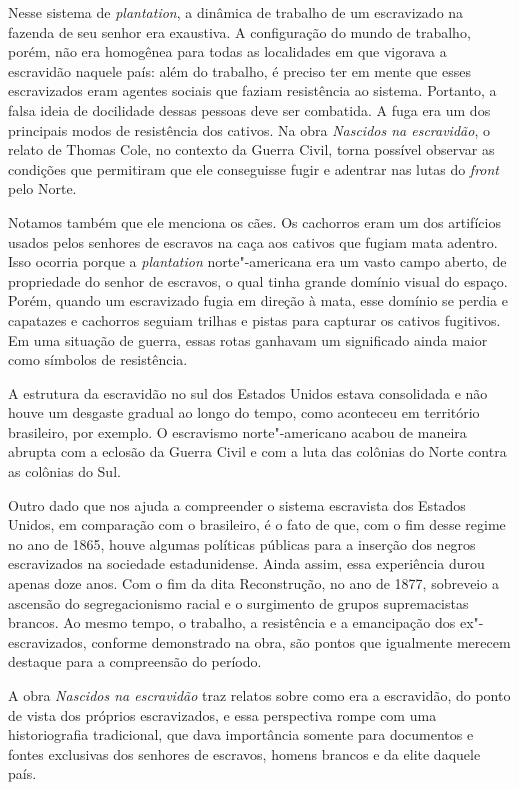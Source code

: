 \documentclass[11pt]{extarticle}
\begin{document}
Nesse sistema de \emph{plantation}, a dinâmica de trabalho de um
escravizado na fazenda de seu senhor era exaustiva. A configuração do
mundo de trabalho, porém, não era homogênea para todas as localidades em
que vigorava a escravidão naquele país: além do trabalho, é preciso ter
em mente que esses escravizados eram agentes sociais que faziam
resistência ao sistema. Portanto, a falsa ideia de docilidade dessas
pessoas deve ser combatida. A fuga era um dos principais modos de
resistência dos cativos. Na obra \emph{Nascidos na escravidão}, o relato
de Thomas Cole, no contexto da Guerra Civil, torna possível observar as
condições que permitiram que ele conseguisse fugir e adentrar nas lutas
do \emph{front} pelo Norte.

Notamos também que ele menciona os cães. Os cachorros eram um dos
artifícios usados pelos senhores de escravos na caça aos cativos que
fugiam mata adentro. Isso ocorria porque a \emph{plantation}
norte"-americana era um vasto campo aberto, de propriedade do senhor de
escravos, o qual tinha grande domínio visual do espaço. Porém, quando um
escravizado fugia em direção à mata, esse domínio se perdia e capatazes
e cachorros seguiam trilhas e pistas para capturar os cativos fugitivos.
Em uma situação de guerra, essas rotas ganhavam um significado ainda
maior como símbolos de resistência.

A estrutura da escravidão no sul dos Estados Unidos estava consolidada e
não houve um desgaste gradual ao longo do tempo, como aconteceu em
território brasileiro, por exemplo. O escravismo norte"-americano acabou
de maneira abrupta com a eclosão da Guerra Civil e com a luta das
colônias do Norte contra as colônias do Sul.

Outro dado que nos ajuda a compreender o sistema escravista dos Estados
Unidos, em comparação com o brasileiro, é o fato de que, com o fim desse
regime no ano de 1865, houve algumas políticas públicas para a inserção
dos negros escravizados na sociedade estadunidense. Ainda assim, essa
experiência durou apenas doze anos. Com o fim da dita Reconstrução, no
ano de 1877, sobreveio a ascensão do segregacionismo racial e o
surgimento de grupos supremacistas brancos. Ao mesmo tempo, o trabalho,
a resistência e a emancipação dos ex"-escravizados, conforme demonstrado
na obra, são pontos que igualmente merecem destaque para a compreensão
do período.

A obra \emph{Nascidos na escravidão} traz relatos sobre como era a
escravidão, do ponto de vista dos próprios escravizados, e essa
perspectiva rompe com uma historiografia tradicional, que dava
importância somente para documentos e fontes exclusivas dos senhores de
escravos, homens brancos e da elite daquele país.
\end{document}
